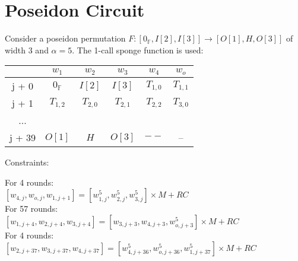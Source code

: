 \section{Poseidon Circuit}
\label{section:poseidon}
Consider a poseidon permutation $F: [0_{\mathbb{F}}, I[2], I[3]] \rightarrow [O[1], H, O[3]]$ of width $3$ and $\alpha = 5$.
The 1-call sponge function is used:
\begin{center}
\begin{tabular}{ |c|c|c|c|c|c| } 
  & $w_1$ & $w_2$ & $w_3$ & $w_4$ & $w_o$\\ 
 \hline
j + 0 & $0_{\mathbb{F}}$ & $I[2]$ & $I[3]$ & $T_{1,0}$ & $T_{1,1}$ \\ 
j + 1 & $T_{1,2}$ & $T_{2,0}$  & $T_{2,1}$  & $T_{2,2}$  & $T_{3,0}$ \\ 
... & & & & &\\ 
j + 39 & $O[1]$ & $H$ & $O[3]$ & $--$ & --\\ 

 \hline
\end{tabular}
\end{center}
 Constraints:
\begin{center}
For 4 rounds: \\
$ [w_{4, j}, w_{o, j}, w_{1, j+1}] = [w_{1,j}^5, w_{2,j}^5, w_{3,j}^5] \times M + RC$ \\
For 57 rounds: \\
$ [w_{1, j +4}, w_{2, j + 4}, w_{3, j+4}] = [w_{3,j+3}, w_{4,j + 3}, w_{o,j +3}^5] \times M + RC$ \\
For 4 rounds: \\
$ [w_{2, j + 37}, w_{3, j + 37}, w_{4, j+37}] = [w_{4,j +36}^5, w_{o,j +36}^5, w_{1,j + 37}^5] \times M + RC$ \\
\end{center}
